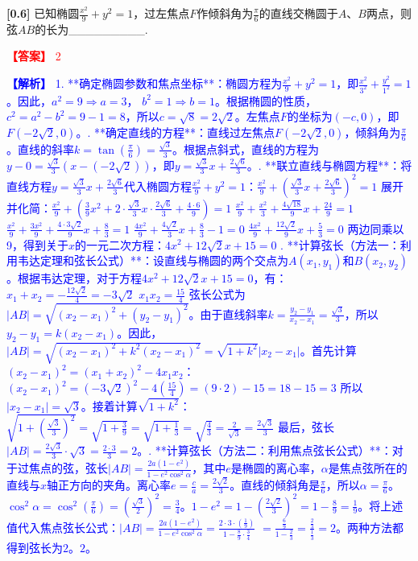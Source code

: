 \documentclass[varwidth=16cm, border=2mm]{standalone}
\begin{document}
\textbf{[0.6]} 已知椭圆$\frac{x^2}{9} + y^2 = 1$，过左焦点$F$作倾斜角为$\frac{\pi}{6}$的直线交椭圆于$A、B$两点，则弦$AB$的长为_________.

\vspace{0.2cm}\par\noindent\textcolor{red}{\textbf{【答案】} 2}
\par\noindent\textcolor{blue}{\textbf{【解析】} 1. **确定椭圆参数和焦点坐标**：\n    椭圆方程为$\frac{x^2}{9} + y^2 = 1$，即$\frac{x^2}{3^2} + \frac{y^2}{1^2} = 1$。\n    因此，$a^2 = 9 \Rightarrow a = 3$， $b^2 = 1 \Rightarrow b = 1$。\n    根据椭圆的性质，$c^2 = a^2 - b^2 = 9 - 1 = 8$，所以$c = \sqrt{8} = 2\sqrt{2}$。\n    左焦点$F$的坐标为$(-c, 0)$，即$F(-2\sqrt{2}, 0)$。\n{}. **确定直线的方程**：\n    直线过左焦点$F(-2\sqrt{2}, 0)$，倾斜角为$\frac{\pi}{6}$。\n    直线的斜率$k = \tan(\frac{\pi}{6}) = \frac{\sqrt{3}}{3}$。\n    根据点斜式，直线的方程为$y - 0 = \frac{\sqrt{3}}{3}(x - (-2\sqrt{2}))$，即$y = \frac{\sqrt{3}}{3}x + \frac{2\sqrt{6}}{3}$。\n{}. **联立直线与椭圆方程**：\n    将直线方程$y = \frac{\sqrt{3}}{3}x + \frac{2\sqrt{6}}{3}$代入椭圆方程$\frac{x^2}{9} + y^2 = 1$：\n    $\frac{x^2}{9} + (\frac{\sqrt{3}}{3}x + \frac{2\sqrt{6}}{3})^2 = 1$ \n    展开并化简：\n    $\frac{x^2}{9} + (\frac{3}{9}x^2 + 2 \cdot \frac{\sqrt{3}}{3}x \cdot \frac{2\sqrt{6}}{3} + \frac{4 \cdot 6}{9}) = 1$ \n    $\frac{x^2}{9} + \frac{x^2}{3} + \frac{4\sqrt{18}}{9}x + \frac{24}{9} = 1$ \n    $\frac{x^2}{9} + \frac{3x^2}{9} + \frac{4 \cdot 3\sqrt{2}}{9}x + \frac{8}{3} = 1$ \n    $\frac{4x^2}{9} + \frac{4\sqrt{2}}{3}x + \frac{8}{3} - 1 = 0$ \n    $\frac{4x^2}{9} + \frac{12\sqrt{2}}{9}x + \frac{5}{3} = 0$ \n    两边同乘以9，得到关于$x$的一元二次方程：\n    $4x^2 + 12\sqrt{2}x + 15 = 0$ \n{}. **计算弦长（方法一：利用韦达定理和弦长公式）**：\n    设直线与椭圆的两个交点为$A(x_1, y_1)$和$B(x_2, y_2)$。\n    根据韦达定理，对于方程$4x^2 + 12\sqrt{2}x + 15 = 0$，有：\n    $x_1 + x_2 = -\frac{12\sqrt{2}}{4} = -3\sqrt{2}$ \n    $x_1 x_2 = \frac{15}{4}$ \n    弦长公式为$|AB| = \sqrt{(x_2 - x_1)^2 + (y_2 - y_1)^2}$。\n    由于直线斜率$k = \frac{y_2 - y_1}{x_2 - x_1} = \frac{\sqrt{3}}{3}$，所以$y_2 - y_1 = k(x_2 - x_1)$。\n    因此，$|AB| = \sqrt{(x_2 - x_1)^2 + k^2(x_2 - x_1)^2} = \sqrt{1 + k^2} |x_2 - x_1|$。\n    首先计算$(x_2 - x_1)^2 = (x_1 + x_2)^2 - 4x_1x_2$：\n    $(x_2 - x_1)^2 = (-3\sqrt{2})^2 - 4(\frac{15}{4}) = (9 \cdot 2) - 15 = 18 - 15 = 3$ \n    所以$|x_2 - x_1| = \sqrt{3}$。\n    接着计算$\sqrt{1 + k^2}$：\n    $\sqrt{1 + (\frac{\sqrt{3}}{3})^2} = \sqrt{1 + \frac{3}{9}} = \sqrt{1 + \frac{1}{3}} = \sqrt{\frac{4}{3}} = \frac{2}{\sqrt{3}} = \frac{2\sqrt{3}}{3}$ \n    最后，弦长$|AB| = \frac{2\sqrt{3}}{3} \cdot \sqrt{3} = \frac{2 \cdot 3}{3} = 2$。\n{}. **计算弦长（方法二：利用焦点弦长公式）**：\n    对于过焦点的弦，弦长$|AB| = \frac{2a(1-e^2)}{1-e^2\cos^2\alpha}$，其中$e$是椭圆的离心率，$\alpha$是焦点弦所在的直线与$x$轴正方向的夹角。\n    离心率$e = \frac{c}{a} = \frac{2\sqrt{2}}{3}$。\n    直线的倾斜角是$\frac{\pi}{6}$，所以$\alpha = \frac{\pi}{6}$。\n    $\cos^2\alpha = \cos^2(\frac{\pi}{6}) = (\frac{\sqrt{3}}{2})^2 = \frac{3}{4}$。\n    $1-e^2 = 1 - (\frac{2\sqrt{2}}{3})^2 = 1 - \frac{8}{9} = \frac{1}{9}$。\n    将上述值代入焦点弦长公式：\n    $|AB| = \frac{2a(1-e^2)}{1-e^2\cos^2\alpha} = \frac{2 \cdot 3 \cdot (\frac{1}{9})}{1 - \frac{8}{9} \cdot \frac{3}{4}}$ \n    $= \frac{\frac{6}{9}}{1 - \frac{2}{3}} = \frac{\frac{2}{3}}{\frac{1}{3}} = 2$。\n    两种方法都得到弦长为$2$。\n{}$2$。}
\end{document}
